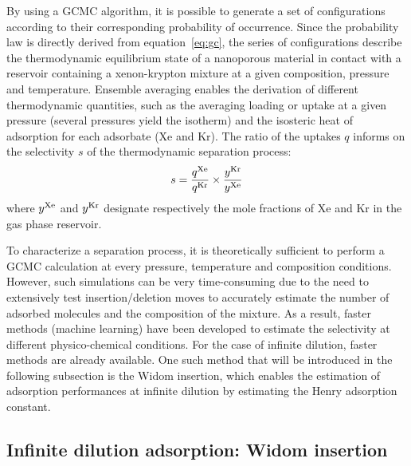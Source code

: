 \documentclass[main.tex]{subfiles}
\begin{document}
By using a GCMC algorithm, it is possible to generate a set of configurations according to their corresponding probability of occurrence. Since the probability law is directly derived from equation~\ref{eq:gc}, the series of configurations describe the thermodynamic equilibrium state of a nanoporous material in contact with a reservoir containing a xenon-krypton mixture at a given composition, pressure and temperature. Ensemble averaging enables the derivation of different thermodynamic quantities, such as the averaging loading or uptake at a given pressure (several pressures yield the isotherm) and the isosteric heat of adsorption for each adsorbate (Xe and Kr). The ratio of the uptakes $q$ informs on the selectivity $s$ of the thermodynamic separation process: 
\begin{equation}\label{eq:selec}
  s = \dfrac{q^{\text{Xe}}}{q^{\text{Kr}}}\times\dfrac{y^{\text{Kr}}}{y^{\text{Xe}}}
\end{equation}
where $y^{\text{Xe}}$ and $y^{\text{Kr}}$ designate respectively the mole fractions of Xe and Kr in the gas phase reservoir.

To characterize a separation process, it is theoretically sufficient to perform a GCMC calculation at every pressure, temperature and composition conditions. However, such simulations can be very time-consuming due to the need to extensively test insertion/deletion moves to accurately estimate the number of adsorbed molecules and the composition of the mixture. As a result, faster methods (machine learning) have been developed to estimate the selectivity at different physico-chemical conditions.\autocite{Simon_2015,Kang_2023} For the case of infinite dilution, faster methods are already available. One such method that will be introduced in the following subsection is the Widom insertion, which enables the estimation of adsorption performances at infinite dilution by estimating the Henry adsorption constant.


\subsection{Infinite dilution adsorption: Widom insertion}\label{sct:widom}
\end{document}
